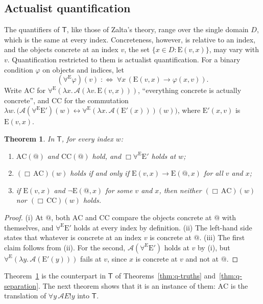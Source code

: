 \documentclass[11pt]{amsart}
\makeatletter
\theoremstyle{plain}
\newtheorem{theorem}{Theorem}[section]
\theoremstyle{definition}
\theoremstyle{remark}
\newcommand{\Act}{\mathcal{A}}
\newcommand{\at}{@}
\newcommand{\Conc}{\mathrm{E}}
\newcommand{\Dom}{D}
\newcommand{\T}{\mathsf{T}}
\makeatother
\begin{document}
\subsection{Actualist quantification}
\label{sec:theory-quantified}

The quantifiers of $\T$, like those of Zalta's theory, range over the
single domain $\Dom$, which is the same at every index. Concreteness,
however, is relative to an index, and the objects concrete at an index
$v$, the set $\{x \in \Dom : \Conc(v,x)\}$, may vary with $v$.
Quantification restricted to them is actualist quantification. For a
binary condition $\varphi$ on objects and indices, let
\[
  (\forall^{\Conc} \varphi)(v) \;:\Longleftrightarrow\;
    \forall x\,(\Conc(v,x) \to \varphi(x,v)).
\]
Write $\mathrm{AC}$ for $\forall^{\Conc}(\lambda x.\,\Act(\lambda
v.\,\Conc(v,x)))$, ``everything concrete is actually concrete'', and
$\mathrm{CC}$ for the commutation
$\lambda w.\,\bigl(\Act(\forall^{\Conc}\Conc')(w) \leftrightarrow
\forall^{\Conc}(\lambda x.\,\Act(\Conc'(x)))(w)\bigr)$, where
$\Conc'(x,v)$ is $\Conc(v,x)$.

\begin{theorem}
\label{thm:theory-quantified}
In $\T$, for every index $w$:
\begin{enumerate}[label=(\roman*)]
\item $\mathrm{AC}(\at)$ and $\mathrm{CC}(\at)$ hold, and
  $\Box\forall^{\Conc}\Conc'$ holds at $w$;
\item $(\Box\,\mathrm{AC})(w)$ holds if and only if
  $\Conc(v,x) \to \Conc(\at,x)$ for all $v$ and $x$;
\item if $\Conc(v,x)$ and $\neg\Conc(\at,x)$ for some $v$ and $x$,
  then neither $(\Box\,\mathrm{AC})(w)$ nor $(\Box\,\mathrm{CC})(w)$
  holds.
\end{enumerate}
\end{theorem}

\begin{proof}
(i) At $\at$, both $\mathrm{AC}$ and $\mathrm{CC}$ compare the
objects concrete at $\at$ with themselves, and
$\forall^{\Conc}\Conc'$ holds at every index by definition.
(ii) The left-hand side states that whatever is concrete at an index
$v$ is concrete at $\at$. (iii) The first claim follows from (ii). For
the second, $\Act(\forall^{\Conc}\Conc')$ holds at $v$ by (i), but
$\forall^{\Conc}(\lambda y.\,\Act(\Conc'(y)))$ fails at $v$, since
$x$ is concrete at $v$ and not at $\at$.
\end{proof}

Theorem~\ref{thm:theory-quantified} is the counterpart in $\T$ of
Theorems~\ref{thm:q-truths} and~\ref{thm:q-separation}. The next
theorem shows that it is an instance of them: $\mathrm{AC}$ is the
translation of $\forall y\,\Act E!y$ into $\T$.
\end{document}
